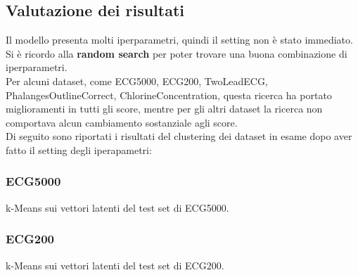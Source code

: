 \subsection{Valutazione dei risultati}
Il modello presenta molti iperparametri, quindi il setting non è stato immediato. Si è ricordo alla \textbf{random search} per poter trovare una buona combinazione di iperparametri.\\
Per alcuni dataset, come ECG5000, ECG200, TwoLeadECG, PhalangesOutlineCorrect, ChlorineConcentration, questa ricerca ha portato miglioramenti in tutti gli score, mentre per gli altri dataset la ricerca non comportava alcun cambiamento sostanziale agli score.\\
Di seguito sono riportati i risultati del clustering dei dataset in esame dopo aver fatto il setting degli iperapametri:

\subsubsection{ECG5000}
\begin{center}
	\begin{table}[H]
		\centering
		\caption{k-Means sui vettori latenti del test set di ECG5000.}
	\end{table}
\end{center}

\subsubsection{ECG200}
\begin{center}
	\begin{table}[H]
		\centering
		\caption{k-Means sui vettori latenti del test set di ECG200.}
	\end{table}
\end{center}

